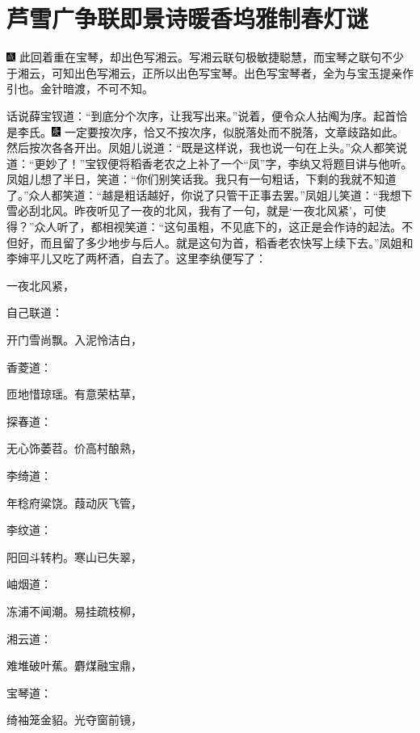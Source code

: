 

\chapter{芦雪广争联即景诗\hspace{.5em}暖香坞雅制春灯谜}

{\includegraphics[width=3mm]{../Images/00005}  \kaishu 此回着重在宝琴，却出色写湘云。写湘云联句极敏捷聪慧，而宝琴之联句不少于湘云，可知出色写湘云，正所以出色写宝琴。出色写宝琴者，全为与宝玉提亲作引也。金针暗渡，不可不知。}

话说薛宝钗道：“到底分个次序，让我写出来。”说着，便令众人拈阄为序。起首恰是李氏。{\includegraphics[width=3mm]{../Images/00004}  \kaishu 一定要按次序，恰又不按次序，似脱落处而不脱落，文章歧路如此。}然后按次各各开出。凤姐儿说道：“既是这样说，我也说一句在上头。”众人都笑说道：“更妙了！”宝钗便将稻香老农之上补了一个“凤”字，李纨又将题目讲与他听。凤姐儿想了半日，笑道：“你们别笑话我。我只有一句粗话，下剩的我就不知道了。”众人都笑道：“越是粗话越好，你说了只管干正事去罢。”凤姐儿笑道：“我想下雪必刮北风。昨夜听见了一夜的北风，我有了一句，就是‘一夜北风紧’，可使得？”众人听了，都相视笑道：“这句虽粗，不见底下的，这正是会作诗的起法。不但好，而且留了多少地步与后人。就是这句为首，稻香老农快写上续下去。”凤姐和李婶平儿又吃了两杯酒，自去了。这里李纨便写了：

一夜北风紧，

自己联道：

开门雪尚飘。入泥怜洁白，

香菱道：

匝地惜琼瑶。有意荣枯草，

探春道：

无心饰萎苕。价高村酿熟，

李绮道：

年稔府粱饶。葭动灰飞管，

李纹道：

阳回斗转杓。寒山已失翠，

岫烟道：

冻浦不闻潮。易挂疏枝柳，

湘云道：

难堆破叶蕉。麝煤融宝鼎，

宝琴道：

绮袖笼金貂。光夺窗前镜，

